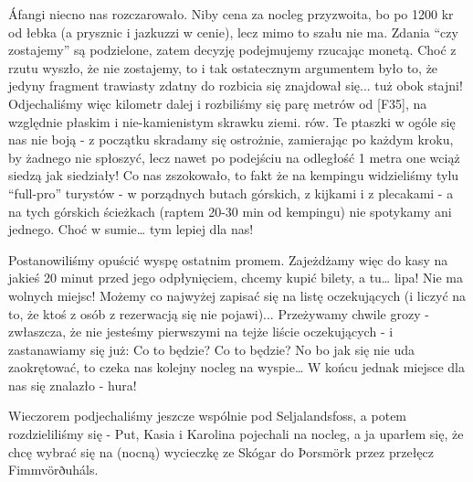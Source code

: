 Áfangi niecno nas rozczarowało. Niby cena za nocleg przyzwoita, bo po 1200 kr od łebka (a prysznic i jazkuzzi w cenie), lecz mimo to szału nie ma. Zdania “czy zostajemy” są podzielone, zatem decyzję podejmujemy rzucając monetą. Choć z rzutu wyszło, że nie zostajemy, to i tak ostatecznym argumentem było to, że jedyny fragment trawiasty zdatny do rozbicia się znajdował się... tuż obok stajni! Odjechaliśmy więc kilometr dalej i rozbiliśmy się parę metrów od [F35], na względnie płaskim i nie-kamienistym skrawku ziemi.
rów. Te ptaszki w ogóle się nas nie boją - z początku skradamy się ostrożnie, zamierając po każdym kroku, by żadnego nie spłoszyć, lecz nawet po podejściu na odległość 1 metra one wciąż siedzą jak siedziały! Co nas zszokowało, to fakt że na kempingu widzieliśmy tylu “full-pro” turystów - w porządnych butach górskich, z kijkami i z plecakami - a na tych górskich ścieżkach (raptem 20-30 min od kempingu) nie spotykamy ani jednego. Choć w sumie… tym lepiej dla nas!


Postanowiliśmy opuścić wyspę ostatnim promem. Zajeżdżamy więc do kasy na jakieś 20 minut przed jego odpłynięciem, chcemy kupić bilety, a tu… lipa! Nie ma wolnych miejsc! Możemy co najwyżej zapisać się na listę oczekujących (i liczyć na to, że ktoś z osób z rezerwacją się nie pojawi)... Przeżywamy chwile grozy - zwłaszcza, że nie jesteśmy pierwszymi na tejże liście oczekujących - i zastanawiamy się już: Co to będzie? Co to będzie? No bo jak się nie uda zaokrętować, to czeka nas kolejny nocleg na wyspie… W końcu jednak miejsce dla nas się znalazło - hura!



Wieczorem podjechaliśmy jeszcze wspólnie pod Seljalandsfoss, a potem rozdzieliliśmy się - Put, Kasia i Karolina pojechali na nocleg, a ja uparłem się, że chcę wybrać się na (nocną) wycieczkę ze Skógar do Þorsmörk przez przełęcz Fimmvörðuháls.